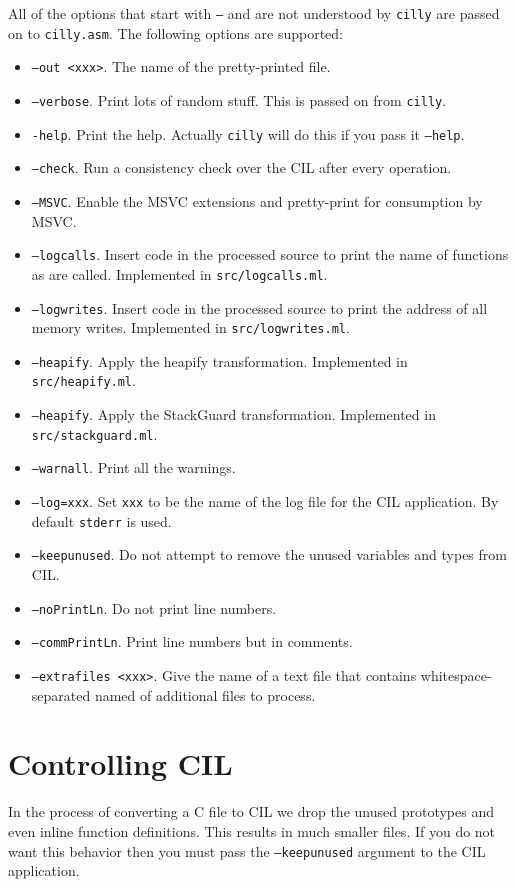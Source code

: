\documentclass{article}
\def\t#1{{\tt #1}}
\begin{document}
 All of the options that start with \t{--} and are not understood by
\t{cilly} are passed on to \t{cilly.asm}. The following options are
supported:
\begin{itemize}
\item \t{--out <xxx>}. The name of the pretty-printed file.
\item \t{--verbose}. Print lots of random stuff. This is passed on from
\t{cilly}.
\item \t{-help}. Print the help. Actually \t{cilly} will do this if you
      pass it \t{--help}.  
\item \t{--check}. Run a consistency check over the CIL after every operation. 
\item \t{--MSVC}. Enable the MSVC extensions and pretty-print for consumption
by MSVC.
\item \t{--logcalls}. Insert code in the processed source to print the name of
functions as are called. Implemented in \t{src/logcalls.ml}.
\item \t{--logwrites}. Insert code in the processed source to print the
address of all memory writes. Implemented in \t{src/logwrites.ml}.
\item \t{--heapify}. Apply the heapify transformation.
                     Implemented in \t{src/heapify.ml}.
\item \t{--heapify}. Apply the StackGuard transformation.
                     Implemented in \t{src/stackguard.ml}.
\item \t{--warnall}. Print all the warnings.
\item \t{--log=xxx}. Set \t{xxx} to be the name of the log file for the CIL
application. By default \t{stderr} is used.
\item \t{--keepunused}. Do not attempt to remove the unused variables and
       types from CIL. 
\item \t{--noPrintLn}. Do not print line numbers.
\item \t{--commPrintLn}. Print line numbers but in comments.
\item \t{--extrafiles <xxx>}. Give the name of a text file that contains
whitespace-separated named of additional files to process.
\end{itemize}


\section{Controlling CIL}

 In the process of converting a C file to CIL we drop the unused prototypes
and even inline function definitions. This results in much smaller files. If
you do not want this behavior then you must pass the \t{--keepunused} argument
to the CIL application. 
\end{document}
